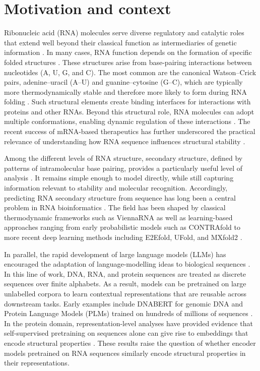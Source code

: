 \documentclass[logo,bsc,singlespacing,parskip]{infthesis}
\begin{document}
\section{Motivation and context}\label{sec:intro_motivation}

Ribonucleic acid (RNA) molecules serve diverse regulatory and catalytic roles 
that extend well beyond their classical function as intermediaries of genetic 
information \citep{alonso2021mechanisms}. In many cases, RNA function depends on the formation of specific folded structures \citep{tinoco1999how,ganser2019roles}. 
These structures arise from base-pairing interactions between nucleotides (A, U, G, and C). The most common are the canonical Watson–Crick pairs, adenine–uracil (A–U) and guanine–cytosine (G–C), which are typically more thermodynamically stable and therefore more likely to form during RNA folding \citep{sponer2005principles}.
Such structural elements create binding interfaces for interactions with proteins and other RNAs. Beyond this structural role, RNA molecules can adopt multiple conformations, enabling dynamic regulation of these interactions \citep{tants2024rna}. 
The recent success of mRNA-based therapeutics has further underscored the practical relevance of understanding how RNA sequence influences structural stability \citep{chaudhary2021mrna, jin2025mrna}.

Among the different levels of RNA structure, secondary structure, defined by patterns of intramolecular base pairing, provides a particularly useful level of analysis \citep{vandivier2016conservation, bai2016atlas}. It remains simple enough to model directly, while still capturing information relevant to stability and molecular recognition. Accordingly, predicting RNA
secondary structure from sequence has long been a central problem in RNA
bioinformatics \citep{mathews2019benchmark}. The field has been shaped by classical
thermodynamic frameworks such as ViennaRNA \citep{lorenz2011viennarna} as well as
learning-based approaches ranging from early probabilistic models such as CONTRAfold
\citep{do2006contrafold} to more recent deep learning methods including E2Efold,
UFold, and MXfold2 \citep{chen2020e2efold,fu2022ufold,sato2021mxfold2}.

In parallel, the rapid development of large language models (LLMs) has encouraged
the adaptation of language-modelling ideas to biological sequences
\citep{sarumi2024llmbioinformatics}. In this line of work, DNA, RNA, and protein
sequences are treated as discrete sequences over finite alphabets. As a result, models can be pretrained on large unlabelled corpora to learn contextual representations that are reusable across downstream tasks. Early examples include DNABERT for genomic DNA \citep{ji2021dnabert} and Protein Language Models (PLMs) trained
on hundreds of millions of sequences \citep{elnaggar2022prottrans,rives2021biological}.
In the protein domain, representation-level analyses have provided 
evidence that self-supervised pretraining on sequences alone can give rise to embeddings that encode structural properties \citep{rao2021unsupervised, vig2021bertology, lin2023evolutionary}. These results raise the question of whether encoder models pretrained on RNA sequences similarly encode structural properties in their representations.
\end{document}
